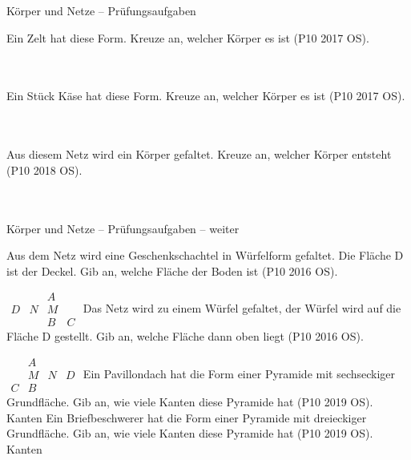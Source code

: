 \setcounter{aufgabe}{1}

\begin{aufgabe}{Körper und Netze – Prüfungsaufgaben}
\begin{teile}
\teil Ein Zelt hat diese Form. Kreuze an, welcher Körper es ist \hfill (P10 2017 OS). \\  \\  \\ 

\teil Ein Stück Käse hat diese Form. Kreuze an, welcher Körper es ist \hfill (P10 2017 OS). \\  \\  \\ 

\teil Aus diesem Netz wird ein Körper gefaltet. Kreuze an, welcher Körper entsteht \hfill (P10 2018 OS). \\  \\  \\ 

\end{teile}
\end{aufgabe}

\begin{aufgabe}{Körper und Netze – Prüfungsaufgaben – weiter}
\begin{teile}
\teil Aus dem Netz wird eine Geschenkschachtel in Würfelform gefaltet. Die Fläche D ist der Deckel. Gib an, welche Fläche der Boden ist \hfill (P10 2016 OS).

$\begin{array}{cccc}  &  & A &  \\ D & N & M &  \\  &  & B & C \end{array}$
\leerfeld
\teil Das Netz wird zu einem Würfel gefaltet, der Würfel wird auf die Fläche D gestellt. Gib an, welche Fläche dann oben liegt \hfill (P10 2016 OS).

$\begin{array}{cccc}  & A &  &  \\  & M & N & D \\ C & B &  &  \end{array}$
\leerfeld
\teil Ein Pavillondach hat die Form einer Pyramide mit sechseckiger Grundfläche. Gib an, wie viele Kanten diese Pyramide hat \hfill (P10 2019 OS). \leerfeld Kanten
\teil Ein Briefbeschwerer hat die Form einer Pyramide mit dreieckiger Grundfläche. Gib an, wie viele Kanten diese Pyramide hat \hfill (P10 2019 OS). \leerfeld Kanten
\end{teile}
\end{aufgabe}

